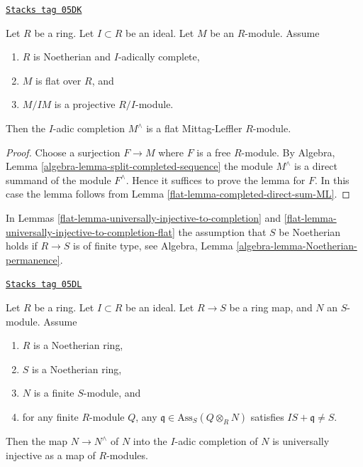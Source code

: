 \begin{lemma}[Lift ML]
\label{flat-lemma-lift-ML}
\href{https://stacks.math.columbia.edu/tag/05DK}{\texttt{Stacks tag 05DK}}

Let $R$ be a ring. Let $I \subset R$ be an ideal.
Let $M$ be an $R$-module.
Assume
\begin{enumerate}
\item $R$ is Noetherian and $I$-adically complete,
\item $M$ is flat over $R$, and
\item $M/IM$ is a projective $R/I$-module.
\end{enumerate}
Then the $I$-adic completion $M^\wedge$ is a flat Mittag-Leffler
$R$-module.
\end{lemma}

\begin{proof}

Choose a surjection $F \to M$ where $F$ is a free $R$-module. By
Algebra, Lemma \ref{algebra-lemma-split-completed-sequence}
the module $M^\wedge$ is a direct summand of the module $F^\wedge$.
Hence it suffices to prove the lemma for $F$.
In this case the lemma follows from
Lemma \ref{flat-lemma-completed-direct-sum-ML}.
\end{proof}

In
Lemmas \ref{flat-lemma-universally-injective-to-completion} and
\ref{flat-lemma-universally-injective-to-completion-flat}
the assumption that $S$ be Noetherian holds if $R \to S$ is of finite type, see
Algebra, Lemma \ref{algebra-lemma-Noetherian-permanence}.

\begin{lemma}
\label{flat-lemma-universally-injective-to-completion}
\href{https://stacks.math.columbia.edu/tag/05DL}{\texttt{Stacks tag 05DL}}

Let $R$ be a ring.
Let $I \subset R$ be an ideal.
Let $R \to S$ be a ring map, and $N$ an $S$-module.
Assume
\begin{enumerate}
\item $R$ is a Noetherian ring,
\item $S$ is a Noetherian ring,
\item $N$ is a finite $S$-module, and
\item for any finite $R$-module $Q$, any
$\mathfrak q \in \text{Ass}_S(Q \otimes_R N)$
satisfies $IS + \mathfrak q \not = S$.
\end{enumerate}
Then the map $N \to N^\wedge$ of $N$ into the $I$-adic completion of $N$
is universally injective as a map of $R$-modules.
\end{lemma}

